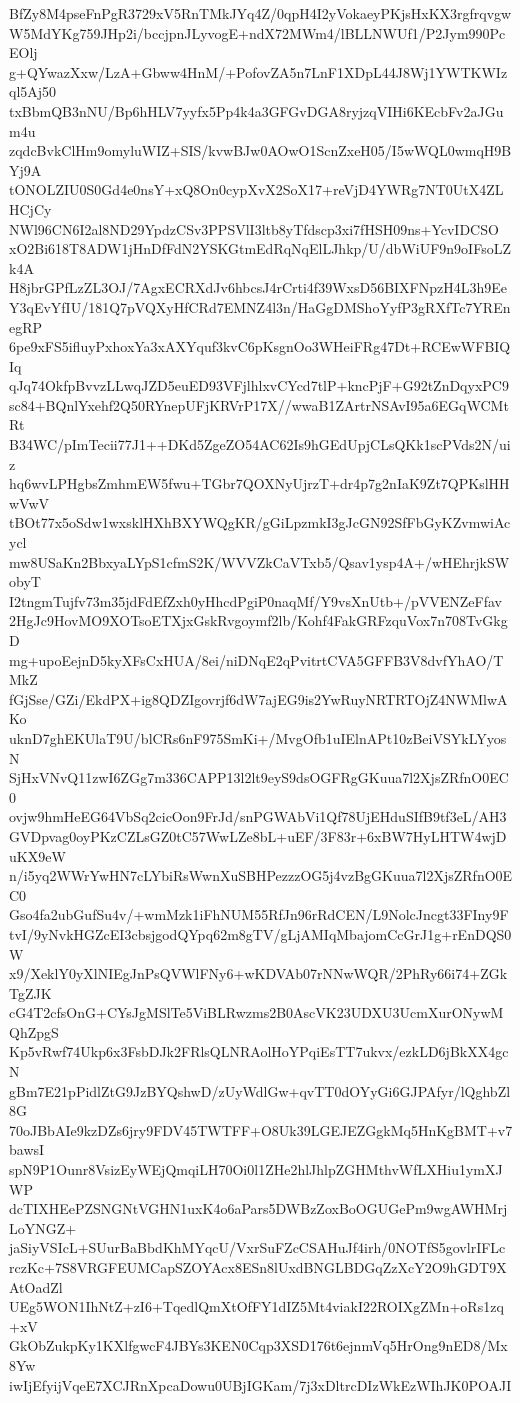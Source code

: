 BfZy8M4pseFnPgR3729xV5RnTMkJYq4Z/0qpH4I2yVokaeyPKjsHxKX3rgfrqvgw
W5MdYKg759JHp2i/bccjpnJLyvogE+ndX72MWm4/lBLLNWUf1/P2Jym990PcEOlj
g+QYwazXxw/LzA+Gbww4HnM/+PofovZA5n7LnF1XDpL44J8Wj1YWTKWIzql5Aj50
txBbmQB3nNU/Bp6hHLV7yyfx5Pp4k4a3GFGvDGA8ryjzqVIHi6KEcbFv2aJGum4u
zqdcBvkClHm9omyluWIZ+SIS/kvwBJw0AOwO1ScnZxeH05/I5wWQL0wmqH9BYj9A
tONOLZIU0S0Gd4e0nsY+xQ8On0cypXvX2SoX17+reVjD4YWRg7NT0UtX4ZLHCjCy
NWl96CN6I2al8ND29YpdzCSv3PPSVlI3ltb8yTfdscp3xi7fHSH09ns+YcvIDCSO
xO2Bi618T8ADW1jHnDfFdN2YSKGtmEdRqNqElLJhkp/U/dbWiUF9n9oIFsoLZk4A
H8jbrGPfLzZL3OJ/7AgxECRXdJv6hbcsJ4rCrti4f39WxsD56BIXFNpzH4L3h9Ee
Y3qEvYfIU/181Q7pVQXyHfCRd7EMNZ4l3n/HaGgDMShoYyfP3gRXfTc7YREnegRP
6pe9xFS5ifluyPxhoxYa3xAXYquf3kvC6pKsgnOo3WHeiFRg47Dt+RCEwWFBIQIq
qJq74OkfpBvvzLLwqJZD5euED93VFjlhlxvCYcd7tlP+kncPjF+G92tZnDqyxPC9
sc84+BQnlYxehf2Q50RYnepUFjKRVrP17X//wwaB1ZArtrNSAvI95a6EGqWCMtRt
B34WC/pImTecii77J1++DKd5ZgeZO54AC62Is9hGEdUpjCLsQKk1scPVds2N/uiz
hq6wvLPHgbsZmhmEW5fwu+TGbr7QOXNyUjrzT+dr4p7g2nIaK9Zt7QPKslHHwVwV
tBOt77x5oSdw1wxsklHXhBXYWQgKR/gGiLpzmkI3gJcGN92SfFbGyKZvmwiAcycl
mw8USaKn2BbxyaLYpS1cfmS2K/WVVZkCaVTxb5/Qsav1ysp4A+/wHEhrjkSWobyT
I2tngmTujfv73m35jdFdEfZxh0yHhcdPgiP0naqMf/Y9vsXnUtb+/pVVENZeFfav
2HgJc9HovMO9XOTsoETXjxGskRvgoymf2lb/Kohf4FakGRFzquVox7n708TvGkgD
mg+upoEejnD5kyXFsCxHUA/8ei/niDNqE2qPvitrtCVA5GFFB3V8dvfYhAO/TMkZ
fGjSse/GZi/EkdPX+ig8QDZIgovrjf6dW7ajEG9is2YwRuyNRTRTOjZ4NWMlwAKo
uknD7ghEKUlaT9U/blCRs6nF975SmKi+/MvgOfb1uIElnAPt10zBeiVSYkLYyosN
SjHxVNvQ11zwI6ZGg7m336CAPP13l2lt9eyS9dsOGFRgGKuua7l2XjsZRfnO0EC0
ovjw9hmHeEG64VbSq2cicOon9FrJd/snPGWAbVi1Qf78UjEHduSIfB9tf3eL/AH3
GVDpvag0oyPKzCZLsGZ0tC57WwLZe8bL+uEF/3F83r+6xBW7HyLHTW4wjDuKX9eW
n/i5yq2WWrYwHN7cLYbiRsWwnXuSBHPezzzOG5j4vzBgGKuua7l2XjsZRfnO0EC0
Gso4fa2ubGufSu4v/+wmMzk1iFhNUM55RfJn96rRdCEN/L9NolcJncgt33FIny9F
tvI/9yNvkHGZcEI3cbsjgodQYpq62m8gTV/gLjAMIqMbajomCcGrJ1g+rEnDQS0W
x9/XeklY0yXlNIEgJnPsQVWlFNy6+wKDVAb07rNNwWQR/2PhRy66i74+ZGkTgZJK
cG4T2cfsOnG+CYsJgMSlTe5ViBLRwzms2B0AscVK23UDXU3UcmXurONywMQhZpgS
Kp5vRwf74Ukp6x3FsbDJk2FRlsQLNRAolHoYPqiEsTT7ukvx/ezkLD6jBkXX4gcN
gBm7E21pPidlZtG9JzBYQshwD/zUyWdlGw+qvTT0dOYyGi6GJPAfyr/lQghbZl8G
70oJBbAIe9kzDZs6jry9FDV45TWTFF+O8Uk39LGEJEZGgkMq5HnKgBMT+v7bawsI
spN9P1Ounr8VsizEyWEjQmqiLH70Oi0l1ZHe2hlJhlpZGHMthvWfLXHiu1ymXJWP
dcTIXHEePZSNGNtVGHN1uxK4o6aPars5DWBzZoxBoOGUGePm9wgAWHMrjLoYNGZ+
jaSiyVSIcL+SUurBaBbdKhMYqcU/VxrSuFZcCSAHuJf4irh/0NOTfS5govlrIFLc
rczKc+7S8VRGFEUMCapSZOYAcx8ESn8lUxdBNGLBDGqZzXcY2O9hGDT9XAtOadZl
UEg5WON1IhNtZ+zI6+TqedlQmXtOfFY1dIZ5Mt4viakI22ROIXgZMn+oRs1zq+xV
GkObZukpKy1KXlfgwcF4JBYs3KEN0Cqp3XSD176t6ejnmVq5HrOng9nED8/Mx8Yw
iwIjEfyijVqeE7XCJRnXpcaDowu0UBjIGKam/7j3xDltrcDIzWkEzWIhJK0POAJI
